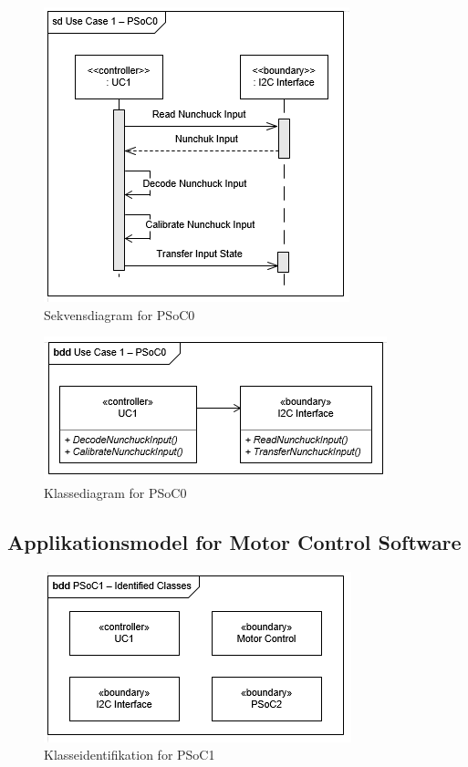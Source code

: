 \begin{figure}[H]
	\centering
	\includegraphics[scale=0.8]{Systemarkitektur/images/UC1PSoC0SequenceDiagram}
	\caption{Sekvensdiagram for PSoC0}
	\label{fig:sekvensUC1PSoC0}
\end{figure}

\begin{figure}[H]
	\centering
	\includegraphics[scale=0.8]{Systemarkitektur/images/klasseUC1PSoC0}
	\caption{Klassediagram for PSoC0}
	\label{fig:klasseUC1PSoC0}
\end{figure}

\subsection{Applikationsmodel for Motor Control Software}

\begin{figure}[H]
	\centering
	\includegraphics[scale=0.8]{Systemarkitektur/images/klasseIdentificationUC1PSoC1}
	\caption{Klasseidentifikation for PSoC1}
	\label{fig:klasseidentifikationUC1PSoC1}
\end{figure}

